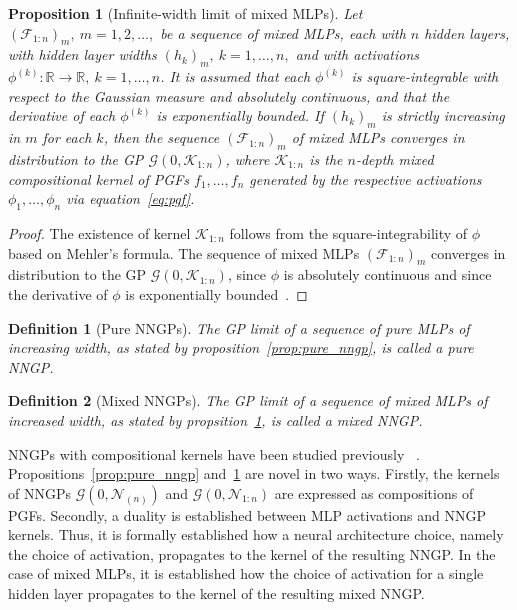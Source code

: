 \documentclass[final, 12pt]{colt2021} %
\newtheorem{dfn}{Definition}
\newtheorem{prop}{Proposition}
\begin{document}
\begin{prop}[Infinite-width limit of mixed MLPs]
\label{prop:mixed_nngp}
Let $(\mathcal{F}_{1:n})_{m},~m=1,2,\ldots,$ be a sequence
of mixed MLPs,
each with $n$ hidden layers,
with hidden layer widths $(h_{k})_{m},~k=1,\ldots,n,$
and with activations
$\phi^{(k)}:\mathbb{R}\rightarrow\mathbb{R},~k=1,\ldots,n$.
It is assumed that each
$\phi^{(k)}$ is square-integrable with respect to the Gaussian measure
and absolutely continuous,
and that the derivative of each $\phi^{(k)}$ is exponentially bounded.
If $(h_k)_{m}$ is strictly increasing in $m$ for each $k$,
then the sequence $(\mathcal{F}_{1:n})_{m}$ of mixed MLPs converges
in distribution to the GP $\mathcal{G}(0,\mathcal{K}_{1:n})$,
where $\mathcal{K}_{1:n}$ is the $n$-depth mixed compositional kernel
of PGFs $f_1,\ldots,f_n$
generated by the respective activations $\phi_1,\ldots,\phi_n$
via equation~\eqref{eq:pgf}.
\end{prop}

\begin{proof}
The existence of kernel $\mathcal{K}_{1:n}$
follows from the square-integrability of $\phi$
based on Mehler's formula.
The sequence of mixed MLPs
$(\mathcal{F}_{1:n})_{m}$ converges in distribution to the
GP $\mathcal{G}(0,\mathcal{K}_{1:n})$,
since $\phi$ is absolutely continuous
and since the derivative of $\phi$
is exponentially bounded~\citep[theorem E.4]{novak2019b}.
\end{proof}

\begin{dfn}[Pure NNGPs]
\label{dfn:pure_nngp}
The GP limit
of a sequence of pure MLPs of increasing width,
as stated by proposition~\ref{prop:pure_nngp},
is called a pure NNGP.
\end{dfn}

\begin{dfn}[Mixed NNGPs]
\label{dfn:mixed_nngp}
The GP limit
of a sequence of mixed MLPs of increased width,
as stated by propsition~\ref{prop:mixed_nngp},
is called a mixed NNGP.
\end{dfn}

NNGPs with compositional kernels have been studied previously
~\citep{matthews2018, novak2019b, agrawal2020}.
Propositions~\ref{prop:pure_nngp} and~\ref{prop:mixed_nngp} 
are novel in two ways.
Firstly, the kernels of NNGPs
$\mathcal{G}(0,\mathcal{N}_{(n)})$ and
$\mathcal{G}(0,\mathcal{N}_{1:n})$
are expressed as compositions of PGFs.
Secondly,
a duality is established
between MLP activations
and NNGP kernels.
Thus, it is formally established
how a neural architecture choice,
namely the choice of activation,
propagates to the kernel of the resulting NNGP.
In the case of mixed MLPs,
it is established how
the choice of activation for a single hidden layer
propagates to the kernel of the resulting mixed NNGP.
\end{document}
